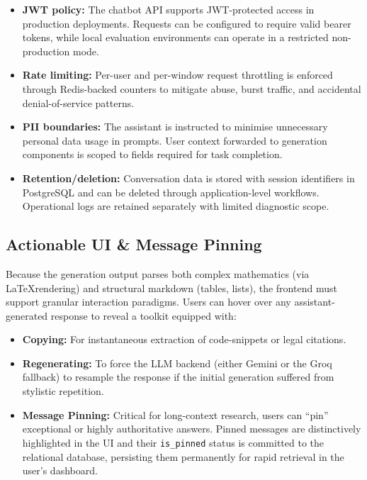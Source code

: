 \documentclass[12pt, a4paper]{article}
\begin{document}
\begin{itemize}[leftmargin=2em]
      \item \textbf{JWT policy:} The chatbot API supports JWT-protected access in production deployments. Requests can be configured to require valid bearer tokens, while local evaluation environments can operate in a restricted non-production mode.
      \item \textbf{Rate limiting:} Per-user and per-window request throttling is enforced through Redis-backed counters to mitigate abuse, burst traffic, and accidental denial-of-service patterns.
      \item \textbf{PII boundaries:} The assistant is instructed to minimise unnecessary personal data usage in prompts. User context forwarded to generation components is scoped to fields required for task completion.
      \item \textbf{Retention/deletion:} Conversation data is stored with session identifiers in PostgreSQL and can be deleted through application-level workflows. Operational logs are retained separately with limited diagnostic scope.
\end{itemize}

\subsection{Actionable UI \& Message Pinning}
Because the generation output parses both complex mathematics (via \LaTeX rendering) and structural markdown (tables, lists), the frontend must support granular interaction paradigms.
Users can hover over any assistant-generated response to reveal a toolkit equipped with:
\begin{itemize}[leftmargin=2em]
  \item \textbf{Copying:} For instantaneous extraction of code-snippets or legal citations.
  \item \textbf{Regenerating:} To force the LLM backend (either Gemini or the Groq fallback) to resample the response if the initial generation suffered from stylistic repetition.
  \item \textbf{Message Pinning:} Critical for long-context research, users can ``pin'' exceptional or highly authoritative answers. Pinned messages are distinctively highlighted in the UI and their \texttt{is\_pinned} status is committed to the relational database, persisting them permanently for rapid retrieval in the user's dashboard.
\end{itemize}
\end{document}
